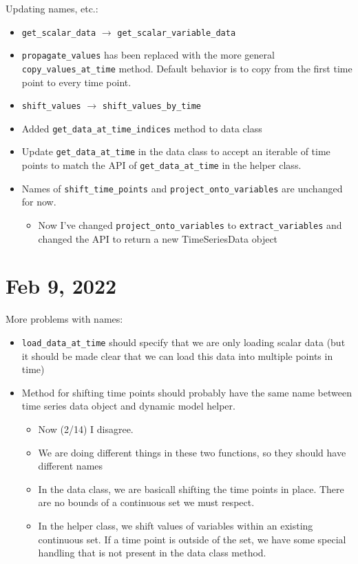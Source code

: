 \documentclass{article}
\begin{document}
Updating names, etc.:
\begin{itemize}
  \item \texttt{get\_scalar\_data} $\rightarrow$
    \texttt{get\_scalar\_variable\_data}
  \item \texttt{propagate\_values} has been replaced with the more
    general \texttt{copy\_values\_at\_time} method.
    Default behavior is to copy from the first time point to every
    time point.
  \item \texttt{shift\_values} $\rightarrow$
    \texttt{shift\_values\_by\_time}
  \item Added \texttt{get\_data\_at\_time\_indices} method to data class
  \item Update \texttt{get\_data\_at\_time} in the data class to accept
    an iterable of time points to match the API of \texttt{get\_data\_at\_time}
    in the helper class.
  \item Names of \texttt{shift\_time\_points} and
    \texttt{project\_onto\_variables} are unchanged for now.
    \begin{itemize}
      \item Now I've changed \texttt{project\_onto\_variables} to
	\texttt{extract\_variables} and changed the API to return a new
	TimeSeriesData object
    \end{itemize}
\end{itemize}

\section{Feb 9, 2022}

More problems with names:
\begin{itemize}
  \item \texttt{load\_data\_at\_time} should specify that we are only
    loading scalar data (but it should be made clear that we can load
    this data into multiple points in time)
  \item Method for shifting time points should probably have the same
    name between time series data object and dynamic model helper.
    \begin{itemize}
      \item Now (2/14) I disagree.
      \item We are doing different things in these two functions, so they
	should have different names
      \item In the data class, we are basicall shifting the time points
	in place. There are no bounds of a continuous set we must
	respect.
      \item In the helper class, we shift values of variables within an
	existing continuous set. If a time point is outside of the set,
	we have some special handling that is not present in the data class
	method.
    \end{itemize}
\end{itemize}
\end{document}
